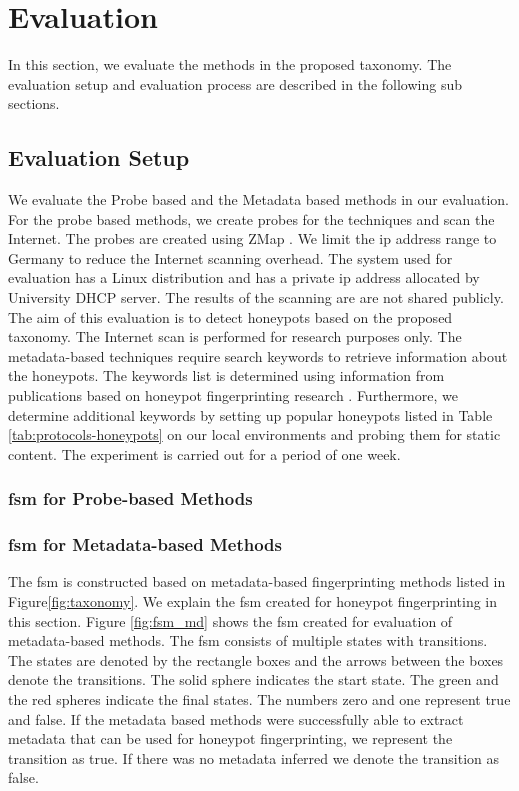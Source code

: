 \section{Evaluation}
\label{sec:eval}

In this section, we evaluate the methods in the proposed taxonomy. The evaluation setup and evaluation process are described in the following sub sections. 

\subsection{Evaluation Setup}
We evaluate the Probe based and the Metadata based methods in our evaluation. For the probe based methods, we create probes for the techniques and scan the Internet. The probes are created using ZMap \cite{zmap}. We limit the \acrshort{ip} address range to Germany to reduce the Internet scanning overhead. The system used for evaluation has a Linux distribution and has a private \acrshort{ip} address allocated by University DHCP server.  The results of the scanning are are not shared publicly. The aim of this evaluation is to detect honeypots based on the proposed taxonomy. The Internet scan is performed for research purposes only. The metadata-based techniques require search keywords to retrieve information about the honeypots. The keywords list is determined using information from publications based on honeypot fingerprinting research \cite{Vetterl2018} \cite{counting}. Furthermore, we determine additional keywords by setting up popular honeypots listed in Table \ref{tab:protocols-honeypots} on our local environments and probing them for static content. The experiment is carried out for a period of one week. 

\subsubsection{\acrshort{fsm} for Probe-based Methods}


\subsubsection{\acrshort{fsm} for Metadata-based Methods}
\label{sec:metadata_fsm}
The \acrshort{fsm} is constructed based on metadata-based fingerprinting methods listed in Figure\ref{fig:taxonomy}. We explain the \acrshort{fsm} created for honeypot fingerprinting in this section. Figure \ref{fig:fsm_md} shows the \acrshort{fsm} created for evaluation of metadata-based methods. The \acrshort{fsm} consists of multiple states with transitions. The states are denoted by the rectangle boxes and the arrows between the boxes denote the transitions. The solid sphere indicates the start state. The green and the red spheres indicate the final states. The numbers zero and one represent true and false. If the metadata based methods were successfully able to extract metadata that can be used for honeypot fingerprinting, we represent the transition as true. If there was no metadata inferred we denote the transition as false. 

